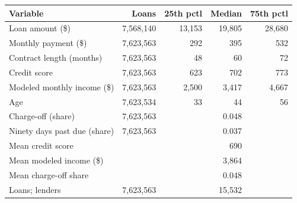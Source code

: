 \begin{tabular}{lrrrr}
\toprule
Variable & Loans & 25th pctl & Median & 75th pctl \\
\midrule
Loan amount (\$) & 7,568,140 & 13,153 & 19,805 & 28,680 \\
Monthly payment (\$) & 7,623,563 & 292 & 395 & 532 \\
Contract length (months) & 7,623,563 & 48 & 60 & 72 \\
Credit score & 7,623,563 & 623 & 702 & 773 \\
Modeled monthly income (\$) & 7,623,563 & 2,500 & 3,417 & 4,667 \\
Age & 7,623,534 & 33 & 44 & 56 \\
Charge-off (share) & 7,623,563 & & 0.048 & \\
Ninety days past due (share) & 7,623,563 & & 0.037 & \\
\midrule
Mean credit score & & & 690 & \\
Mean modeled income (\$) & & & 3,864 & \\
Mean charge-off share & & & 0.048 & \\
Loans; lenders & 7,623,563 & & 15,532 & \\
\bottomrule
\end{tabular}
